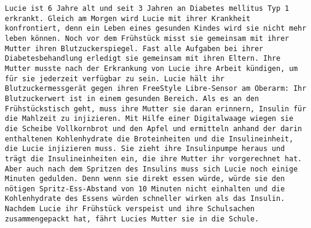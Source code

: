 	\texttt{Lucie ist 6 Jahre alt und seit 3 Jahren an Diabetes mellitus Typ 1 erkrankt.\newline
		Gleich am Morgen wird Lucie mit ihrer Krankheit konfrontiert, denn ein Leben \newline
		eines gesunden Kindes wird sie nicht mehr leben können. Noch vor dem \newline
		Frühstück misst sie gemeinsam mit ihrer Mutter ihren Blutzuckerspiegel. \newline
		Fast alle Aufgaben bei ihrer Diabetesbehandlung erledigt sie gemeinsam \newline
		mit ihren Eltern. Ihre Mutter musste nach der Erkrankung von Lucie ihre \newline
		Arbeit kündigen, um für sie jederzeit verfügbar zu sein.\newline
		Lucie hält ihr Blutzuckermessgerät gegen ihren FreeStyle Libre-Sensor \newline
		am Oberarm: Ihr Blutzuckerwert ist in einem gesunden Bereich. \newline
		Als es an den Frühstückstisch geht, muss ihre Mutter sie daran \newline
		erinnern, Insulin für die Mahlzeit zu injizieren. Mit Hilfe einer \newline
		Digitalwaage wiegen sie die Scheibe Vollkornbrot und den \newline
		Apfel und ermitteln anhand der darin enthaltenen Kohlenhydrate \newline
		die Broteinheiten und die Insulineinheit, die Lucie injizieren muss. \newline
		Sie zieht ihre Insulinpumpe heraus und trägt die Insulineinheiten ein,\newline
		die ihre Mutter ihr vorgerechnet hat. \newline
		Aber auch nach dem Spritzen des Insulins muss sich Lucie noch \newline
		einige Minuten gedulden. Denn wenn sie direkt essen würde, \newline
		würde sie den nötigen Spritz-Ess-Abstand von 10 Minuten nicht\newline
		einhalten und die Kohlenhydrate des Essens würden schneller \newline
		wirken als das Insulin.\newline
		Nachdem Lucie ihr Frühstück verspeist und ihre Schulsachen \newline
		zusammengepackt hat, fährt Lucies Mutter sie in die Schule.\newline
}
